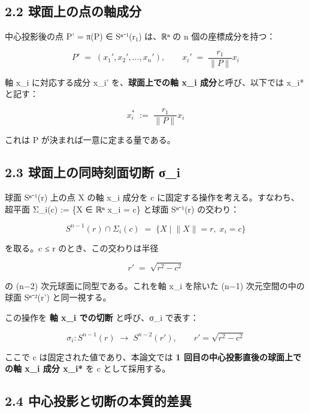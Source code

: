 \documentclass[a4paper,11pt]{ltjsarticle}
\theoremstyle{definition}
\theoremstyle{remark}
\begin{document}
\subsection{2.2
球面上の点の軸成分}\label{ux7403ux9762ux4e0aux306eux70b9ux306eux8ef8ux6210ux5206}

中心投影後の点 P' = π(P) ∈ Sⁿ⁻¹(r₁) は、ℝⁿ の n 個の座標成分を持つ：

\[
P' \;=\; (x_1', x_2', \ldots, x_n'), \qquad x_i' \;=\; \frac{r_1}{\lVert P\rVert} x_i
\]

軸 x\_i に対応する成分 x\_i' を、\textbf{球面上での軸 x\_i
成分}と呼び、以下では x\_i* と記す：

\[
x_i^{*} \;:=\; \frac{r_1}{\lVert P\rVert} x_i
\]

これは P が決まれば一意に定まる量である。

\subsection{2.3 球面上の同時刻面切断
σ\_i}\label{ux7403ux9762ux4e0aux306eux540cux6642ux523bux9762ux5207ux65ad-ux3c3_i}

球面 Sⁿ⁻¹(r) 上の点 X の軸 x\_i 成分を c
に固定する操作を考える。すなわち、超平面 Σ\_i(c) := \{X ∈ ℝⁿ \textbar{}
x\_i = c\} と球面 Sⁿ⁻¹(r) の交わり：

\[
S^{n-1}(r) \cap \Sigma_i(c) \;=\; \bigl\{X \;\big|\; \lVert X\rVert = r,\; x_i = c\bigr\}
\]

を取る。\textbar c\textbar{} ≤ r のとき、この交わりは半径

\[
r' \;=\; \sqrt{r^{2} - c^{2}}
\]

の (n−2) 次元球面に同型である。これを軸 x\_i を除いた (n−1)
次元空間の中の球面 Sⁿ⁻²(r') と同一視する。

この操作を \textbf{軸 x\_i での切断} と呼び、σ\_i で表す：

\[
\sigma_{i}: S^{n-1}(r) \;\longrightarrow\; S^{n-2}(r'), \qquad r' = \sqrt{r^{2} - c^{2}}
\]

ここで c は固定された値であり、本論文では \textbf{1
回目の中心投影直後の球面上での軸 x\_i 成分 x\_i*} を c として採用する。

\subsection{2.4
中心投影と切断の本質的差異}\label{ux4e2dux5fc3ux6295ux5f71ux3068ux5207ux65adux306eux672cux8ceaux7684ux5deeux7570}
\end{document}
